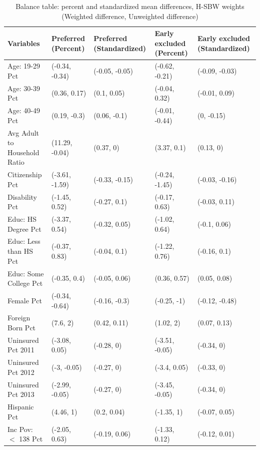 \newpage

\begin{landscape}
\begin{table}[h!]\caption{Balance table: percent and standardized mean differences, H-SBW weights \\ (Weighted difference, Unweighted difference)}\label{tab:baltab1}
\centering
\begin{threeparttable}\begin{tabular}{lllll}
  \hline
Variables & Preferred (Percent) & Preferred (Standardized) & Early excluded (Percent) & Early excluded (Standardized) \\ 
  \hline
Age: 19-29 Pct & (-0.34, -0.34) & (-0.05, -0.05) & (-0.62, -0.21) & (-0.09, -0.03) \\ 
  Age: 30-39 Pct & (0.36, 0.17) & (0.1, 0.05) & (-0.04, 0.32) & (-0.01, 0.09) \\ 
  Age: 40-49 Pct & (0.19, -0.3) & (0.06, -0.1) & (-0.01, -0.44) & (0, -0.15) \\ 
  Avg Adult to Household Ratio & (11.29, -0.04) & (0.37, 0) & (3.37, 0.1) & (0.13, 0) \\ 
  Citizenship Pct & (-3.61, -1.59) & (-0.33, -0.15) & (-0.24, -1.45) & (-0.03, -0.16) \\ 
  Disability Pct & (-1.45, 0.52) & (-0.27, 0.1) & (-0.17, 0.63) & (-0.03, 0.11) \\ 
  Educ: HS Degree Pct & (-3.37, 0.54) & (-0.32, 0.05) & (-1.02, 0.64) & (-0.1, 0.06) \\ 
  Educ: Less than HS Pct & (-0.37, 0.83) & (-0.04, 0.1) & (-1.22, 0.76) & (-0.16, 0.1) \\ 
  Educ: Some College Pct & (-0.35, 0.4) & (-0.05, 0.06) & (0.36, 0.57) & (0.05, 0.08) \\ 
  Female Pct & (-0.34, -0.64) & (-0.16, -0.3) & (-0.25, -1) & (-0.12, -0.48) \\ 
  Foreign Born Pct & (7.6, 2) & (0.42, 0.11) & (1.02, 2) & (0.07, 0.13) \\ 
  Uninsured Pct 2011 & (-3.08, 0.05) & (-0.28, 0) & (-3.51, -0.05) & (-0.34, 0) \\ 
  Uninsured Pct 2012 & (-3, -0.05) & (-0.27, 0) & (-3.4, 0.05) & (-0.33, 0) \\ 
  Uninsured Pct 2013 & (-2.99, -0.05) & (-0.27, 0) & (-3.45, -0.05) & (-0.34, 0) \\ 
  Hispanic Pct & (4.46, 1) & (0.2, 0.04) & (-1.35, 1) & (-0.07, 0.05) \\ 
  Inc Pov: $<$ 138 Pct & (-2.05, 0.63) & (-0.19, 0.06) & (-1.33, 0.12) & (-0.12, 0.01) \\ 

\end{tabular}
\end{threeparttable}
\end{table}
\end{landscape}
